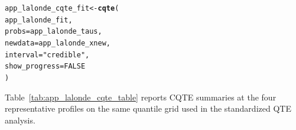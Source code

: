 \documentclass[article]{jss}\usepackage[]{graphicx}\usepackage[]{xcolor}
\makeatletter
\newcommand{\hlnum}[1]{\textcolor[rgb]{0.686,0.059,0.569}{#1}}%
\newcommand{\hlsng}[1]{\textcolor[rgb]{0.192,0.494,0.8}{#1}}%
\newcommand{\hldef}[1]{\textcolor[rgb]{0.345,0.345,0.345}{#1}}%
\newcommand{\hlkwb}[1]{\textcolor[rgb]{0.69,0.353,0.396}{#1}}%
\newcommand{\hlkwc}[1]{\textcolor[rgb]{0.333,0.667,0.333}{#1}}%
\newcommand{\hlkwd}[1]{\textcolor[rgb]{0.737,0.353,0.396}{\textbf{#1}}}%
\newenvironment{kframe}{%
 \def\at@end@of@kframe{}%
 \ifinner\ifhmode%
  \def\at@end@of@kframe{\end{minipage}}%
  \begin{minipage}{\columnwidth}%
 \fi\fi%
 \def\FrameCommand##1{\hskip\@totalleftmargin \hskip-\fboxsep
 \colorbox{shadecolor}{##1}\hskip-\fboxsep
     \hskip-\linewidth \hskip-\@totalleftmargin \hskip\columnwidth}%
 \MakeFramed {\advance\hsize-\width
   \@totalleftmargin\z@ \linewidth\hsize
   \@setminipage}}%
 {\par\unskip\endMakeFramed%
 \at@end@of@kframe}
\newenvironment{knitrout}{}{} %
\makeatother
\begin{document}
\begin{knitrout}\footnotesize
{}\color{fgcolor}\begin{kframe}
\begin{alltt}
\hldef{app_lalonde_cqte_fit} \hlkwb{<-} \hlkwd{cqte}\hldef{(}
  \hldef{app_lalonde_fit,}
  \hlkwc{probs} \hldef{= app_lalonde_taus,}
  \hlkwc{newdata} \hldef{= app_lalonde_xnew,}
  \hlkwc{interval} \hldef{=} \hlsng{"credible"}\hldef{,}
  \hlkwc{show_progress} \hldef{=} \hlnum{FALSE}
\hldef{)}
\end{alltt}
\end{kframe}
\end{knitrout}

Table~\ref{tab:app_lalonde_cqte_table} reports CQTE summaries at the
four representative profiles on the same quantile grid used in the
standardized QTE analysis.
\end{document}
